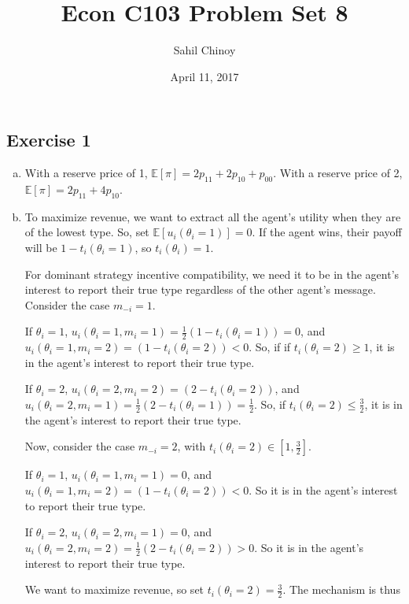 \documentclass{article}
\title{Econ C103 Problem Set 8}
\author{Sahil Chinoy}
\date{April 11, 2017}
\begin{document}
\maketitle{}

\subsection*{Exercise 1}

\begin{enumerate}[(a)]
	\item

	With a reserve price of 1, $\mathbb{E}[\pi] = 2p_{11} + 2p_{10} + p_{00}$. With a reserve price of 2, $\mathbb{E}[\pi] = 2p_{11} + 4 p_{10}$.

	\item

	To maximize revenue, we want to extract all the agent's utility when they are of the lowest type. So, set $\mathbb{E}[u_i(\theta_i = 1)] = 0$. If the agent wins, their payoff will be $1 - t_i(\theta_i = 1)$, so $t_i(\theta_i) = 1$.

	For dominant strategy incentive compatibility, we need it to be in the agent's interest to report their true type regardless of the other agent's message. Consider the case $m_{-i} = 1$. 

	If $\theta_i = 1$, $u_i(\theta_i=1, m_i =1) = \frac{1}{2}(1-t_i(\theta_i = 1)) = 0$, and $u_i(\theta_i=1, m_i =2) = (1-t_i(\theta_i = 2)) < 0$. So, if if $t_i(\theta_i = 2) \geq 1$, it is in the agent's interest to report their true type.

	If $\theta_i = 2$, $u_i(\theta_i=2, m_i =2) = (2-t_i(\theta_i = 2))$, and $u_i(\theta_i=2, m_i =1) = \frac{1}{2}(2-t_i(\theta_i = 1)) = \frac{1}{2}$. So, if $t_i(\theta_i = 2) \leq \frac{3}{2}$, it is in the agent's interest to report their true type.

	Now, consider the case $m_{-i} = 2$, with $t_i(\theta_i = 2) \in [1, \frac{3}{2}]$.

	If $\theta_i = 1$, $u_i(\theta_i=1, m_i =1) = 0$, and $u_i(\theta_i=1, m_i =2) = (1-t_i(\theta_i = 2)) < 0$. So it is in the agent's interest to report their true type.

	If $\theta_i = 2$, $u_i(\theta_i=2, m_i =1) = 0$, and $u_i(\theta_i=2, m_i =2) = \frac{1}{2}(2-t_i(\theta_i = 2)) > 0$. So it is in the agent's interest to report their true type.

	We want to maximize revenue, so set $t_i(\theta_i = 2) = \frac{3}{2}$. The mechanism is thus


\end{enumerate}
\end{document}
